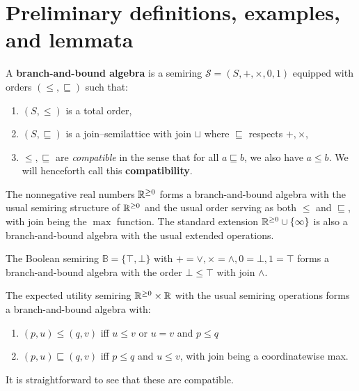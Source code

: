 \documentclass[acmsmall,review]{acmart}\settopmatter{printfolios=true,printccs=false,printacmref=false}
\begin{document}
\section{Preliminary definitions, examples, and lemmata}

\begin{definition}
  A \textbf{branch-and-bound algebra} is a semiring $\mathcal S = (S, + , \times, 0 ,1)$ equipped with orders $(\leq, \sqsubseteq)$ such that:
  \begin{enumerate}
    \item $(S, \leq)$ is a total order,
    \item $(S, \sqsubseteq)$ is a join--semilattice with join $\sqcup$ where $\sqsubseteq$ respects $+,\times$, 
    \item $\leq, \sqsubseteq$ are \textit{compatible} in the sense that for all $a \sqsubseteq b$, we also have $a \leq b$. We will henceforth call this \textbf{compatibility}.
  \end{enumerate}
\end{definition}

\begin{example}
  The nonnegative real numbers $\mathbb{R}^{\geq 0}$ forms a branch-and-bound algebra with the usual semiring structure of $\mathbb{R}^{\geq 0}$ and the usual order serving as both $\leq$ and $\sqsubseteq$, with join being the $\max$ function. The standard extension $\mathbb{R}^{\geq 0} \cup \{\infty\}$ is also a branch-and-bound algebra with the usual extended operations.
\end{example}

\begin{example}
  The Boolean semiring $\mathbb B = \{\top, \bot\}$ with $+ = \lor, \times = \land, 0 = \bot, 1 = \top$ forms a branch-and-bound algebra with the order $\bot \leq \top$ with join $\land$. 
\end{example}


\begin{example}
  The expected utility semiring $\mathbb{R}^{\geq 0} \times \mathbb{R}$ with the usual semiring operations forms a branch-and-bound algebra with:
  \begin{enumerate}
    \item $(p,u) \leq (q,v)$ iff $u \leq v$ or $u=v$ and $p \leq q$ 
    \item $(p,u) \sqsubseteq (q,v)$ iff $p \leq q$ and $u \leq v$, with join being a coordinatewise max.
  \end{enumerate} 
  It is straightforward to see that these are compatible.
\end{example}
\end{document}
